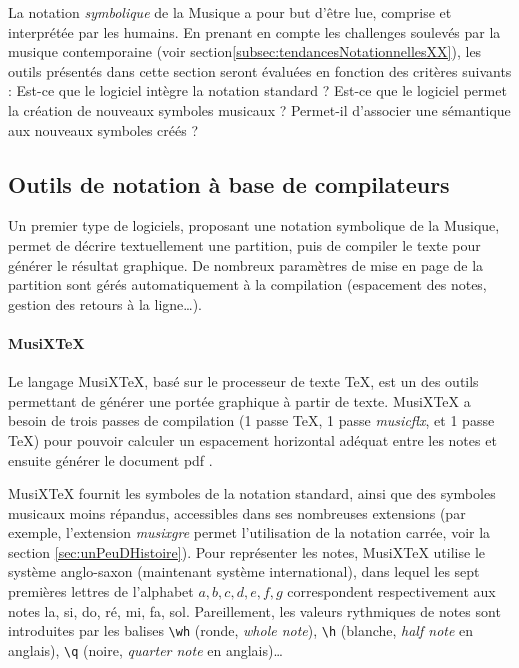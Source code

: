 La notation \textit{symbolique} de la Musique a pour but d'être lue, comprise et interprétée par les humains.  
En prenant en compte les challenges soulevés par la musique contemporaine (voir section\ref{subsec:tendancesNotationnellesXX}), les outils présentés dans cette section seront évaluées en fonction des critères suivants :
Est-ce que le logiciel intègre la notation standard ? Est-ce que le logiciel permet la création de nouveaux symboles musicaux ? Permet-il d'associer une sémantique aux nouveaux symboles créés ?

\subsection{Outils de notation à base de compilateurs}
\label{subsec:notationABaseCompilateurs}
Un premier type de logiciels, proposant une notation symbolique de la Musique, permet de décrire textuellement une partition, puis de compiler le texte pour générer le résultat graphique.
De nombreux paramètres de mise en page de la partition sont gérés automatiquement à la compilation (espacement des notes, gestion des retours à la ligne…).

\paragraph{MusiXTeX} Le langage MusiXTeX, basé sur le processeur de texte \TeX, est un des outils permettant de générer une portée graphique à partir de texte. MusiXTeX a besoin de trois passes de compilation (1 passe \TeX, 1 passe \textit{musicflx}, et 1 passe \TeX) pour pouvoir calculer un espacement horizontal adéquat entre les notes et ensuite générer le document pdf \cite{musixtex2016}.

MusiXTeX fournit les symboles de la notation standard, ainsi que des symboles musicaux moins répandus, accessibles dans ses nombreuses extensions (par exemple, l'extension \textit{musixgre} permet l'utilisation de la notation carrée, voir la section \ref{sec:unPeuDHistoire}).
Pour représenter les notes, MusiXTeX utilise le système anglo-saxon (maintenant système international), dans lequel les sept premières lettres de l'alphabet $a, b, c, d, e, f, g$ correspondent respectivement aux notes la, si, do, ré, mi, fa, sol. Pareillement, les valeurs rythmiques de notes sont introduites par les balises \lstinline{\wh} (ronde, \textit{whole note}), \lstinline{\h} (blanche, \textit{half note} en anglais), \lstinline{\q} (noire, \textit{quarter note} en anglais)… 

